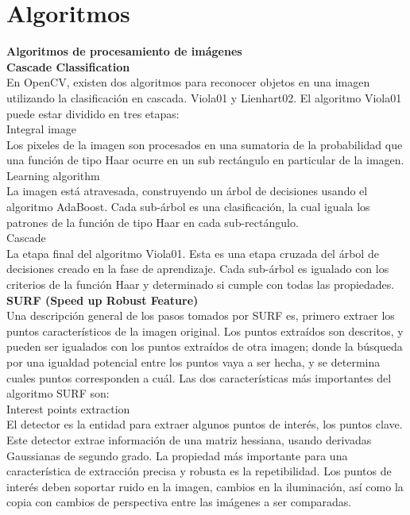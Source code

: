 \section{Algoritmos}
\textbf{\large{Algoritmos de procesamiento de imágenes}}\cite{tracking}\\

\textbf{Cascade Classification}\\

En OpenCV, existen dos algoritmos para reconocer objetos en una imagen utilizando la clasificación en cascada. Viola01 y Lienhart02. El algoritmo Viola01 puede estar dividido en tres etapas:\\

Integral image\\
Los pixeles de la imagen son procesados en una sumatoria de la probabilidad que una función de tipo Haar ocurre en un sub rectángulo en particular de la imagen.\\

Learning algorithm\\
La imagen está atravesada, construyendo un árbol de decisiones usando el algoritmo AdaBoost. Cada sub-árbol es una clasificación, la cual iguala los patrones de la función de tipo Haar en cada sub-rectángulo.\\

Cascade\\
La etapa final del algoritmo Viola01. Esta es una etapa cruzada del árbol de decisiones creado en la fase de aprendizaje. Cada sub-árbol es igualado con los criterios de la función Haar y determinado si cumple con todas las propiedades.\\

\textbf{SURF (Speed up Robust Feature)}\\

Una descripción general de los pasos tomados por SURF es, primero extraer los puntos característicos de la imagen original. Los puntos extraídos son descritos, y pueden ser igualados con los puntos extraídos de otra imagen; donde la búsqueda por una igualdad potencial entre los puntos vaya a ser hecha, y se determina cuales puntos corresponden a cuál. Las dos características más importantes del algoritmo SURF son:\\

Interest points extraction\\
El detector es la entidad para extraer algunos puntos de interés, los puntos clave. Este detector extrae información de una matriz hessiana, usando derivadas Gaussianas de segundo grado. La propiedad más importante para una característica de extracción precisa y robusta es la repetibilidad. Los puntos de interés deben soportar ruido en la imagen, cambios en la iluminación, así como la copia con cambios de perspectiva entre las imágenes a ser comparadas.\\

